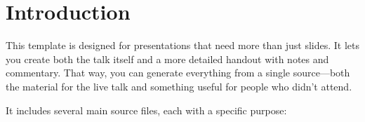 
\tableofcontents

\section{Introduction}


This template is designed for presentations that need more than just slides.
It lets you create both the talk itself and a more detailed handout with notes and
commentary. That way, you can generate everything from a single source—both the
material for the live talk and something useful for people who didn’t attend.

It includes several main source files, each with a specific purpose:

